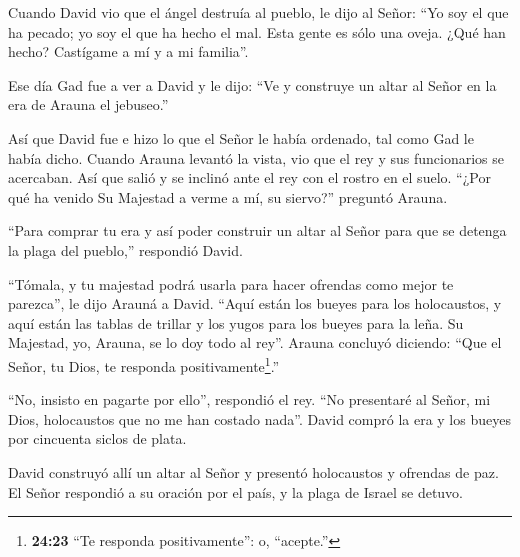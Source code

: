  Cuando David vio que el ángel destruía al pueblo, le dijo
al Señor: ``Yo soy el que ha pecado; yo soy el que ha hecho el mal. Esta
gente es sólo una oveja. ¿Qué han hecho? Castígame a mí y a mi
familia''.

 Ese día Gad fue a ver a David y le dijo: ``Ve y construye
un altar al Señor en la era de Arauna el jebuseo.''

 Así que David fue e hizo lo que el Señor le había
ordenado, tal como Gad le había dicho.  Cuando Arauna
levantó la vista, vio que el rey y sus funcionarios se acercaban. Así
que salió y se inclinó ante el rey con el rostro en el suelo.
 ``¿Por qué ha venido Su Majestad a verme a mí, su
siervo?'' preguntó Arauna.

``Para comprar tu era y así poder construir un altar al Señor para que
se detenga la plaga del pueblo,'' respondió David.

 ``Tómala, y tu majestad podrá usarla para hacer ofrendas
como mejor te parezca'', le dijo Arauná a David. ``Aquí están los bueyes
para los holocaustos, y aquí están las tablas de trillar y los yugos
para los bueyes para la leña.  Su Majestad, yo, Arauna, se
lo doy todo al rey''. Arauna concluyó diciendo: ``Que el Señor, tu Dios,
te responda positivamente\footnote{\textbf{24:23} ``Te responda
  positivamente'': o, ``acepte.''}.''

 ``No, insisto en pagarte por ello'', respondió el rey.
``No presentaré al Señor, mi Dios, holocaustos que no me han costado
nada''. David compró la era y los bueyes por cincuenta siclos de plata.

 David construyó allí un altar al Señor y presentó
holocaustos y ofrendas de paz. El Señor respondió a su oración por el
país, y la plaga de Israel se detuvo.
